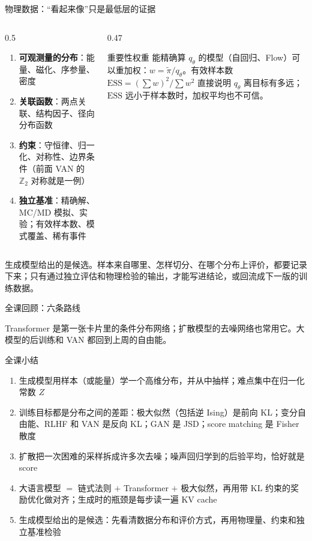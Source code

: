 \documentclass[aspectratio=169,10pt,UTF8,fontset=none]{ctexbeamer}
\begin{document}
\begin{frame}{物理数据：“看起来像”只是最低层的证据}
  \begin{columns}[T]
    \begin{column}{0.5\textwidth}
      \small
      \begin{enumerate}
        \item \textbf{可观测量的分布}：能量、磁化、序参量、密度
        \item \textbf{关联函数}：两点关联、结构因子、径向分布函数
        \item \textbf{约束}：守恒律、归一化、对称性、边界条件（前面 VAN 的 $\mathbb Z_2$ 对称就是一例）
        \item \textbf{独立基准}：精确解、MC/MD 模拟、实验；有效样本数、模式覆盖、稀有事件
      \end{enumerate}
    \end{column}
    \begin{column}{0.47\textwidth}
      \begin{concept}{重要性权重}
        能精确算 $q_\theta$ 的模型（自回归、Flow）可以重加权：$w=\tilde\pi/q_\theta$。有效样本数 $\mathrm{ESS}=(\sum w)^2/\sum w^2$ 直接说明 $q_\theta$ 离目标有多远；$\mathrm{ESS}$ 远小于样本数时，加权平均也不可信。
      \end{concept}
    \end{column}
  \end{columns}
  \vfill
  \begin{takeaway}
    生成模型给出的是候选。样本来自哪里、怎样切分、在哪个分布上评价，都要记录下来；只有通过独立评估和物理检验的输出，才能写进结论，或回流成下一版的训练数据。
  \end{takeaway}
\end{frame}

\begin{frame}{全课回顾：六条路线}
  \centering
  
  \vfill
  {\small Transformer 是第一张卡片里的条件分布网络；扩散模型的去噪网络也常用它。大模型的后训练和 VAN 都回到上周的自由能。}
\end{frame}


\begin{frame}{全课小结}
  \begin{takeaway}[带走的几件事]
    \begin{enumerate}
      \item 生成模型用样本（或能量）学一个高维分布，并从中抽样；难点集中在归一化常数 $Z$
      \item 训练目标都是分布之间的差距：极大似然（包括逆 Ising）是前向 KL；变分自由能、RLHF 和 VAN 是反向 KL；GAN 是 JSD；score matching 是 Fisher 散度
      \item 扩散把一次困难的采样拆成许多次去噪；噪声回归学到的后验平均，恰好就是 score
      \item 大语言模型 $=$ 链式法则 $+$ Transformer $+$ 极大似然，再用带 KL 约束的奖励优化做对齐；生成时的瓶颈是每步读一遍 KV cache
      \item 生成模型给出的是候选：先看清数据分布和评价方式，再用物理量、约束和独立基准检验
    \end{enumerate}
  \end{takeaway}
\end{frame}
\end{document}
